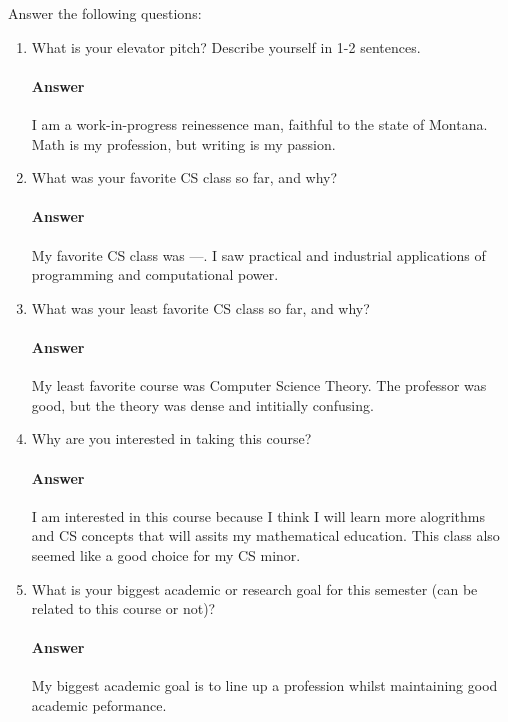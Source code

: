 \documentclass{article}
\begin{document}
Answer the following questions:
\begin{enumerate}
    \item What is your elevator pitch?  Describe yourself in 1-2
                sentences.

        \paragraph{Answer} I am a work-in-progress reinessence man, faithful to the state of Montana. Math is my profession, but writing is my passion.

     \item What was your favorite CS class so far, and why?

         \paragraph{Answer} My favorite CS class was ---. I saw practical and industrial applications of programming and computational power.

     \item What was your least favorite CS class so far, and why?

         \paragraph{Answer} My least favorite course was Computer Science Theory. The professor was good, but the theory was dense and intitially confusing.

     \item Why are you interested in taking this course?

         \paragraph{Answer} I am interested in this course because I think I will learn more alogrithms and CS concepts that will assits my mathematical education. This class also seemed like a good choice for my CS minor.

     \item What is your biggest academic or research goal for this semester (can
         be related to this course or not)?

         \paragraph{Answer} My biggest academic goal is to line up a profession whilst maintaining good academic peformance.


\end{enumerate}
\end{document}
